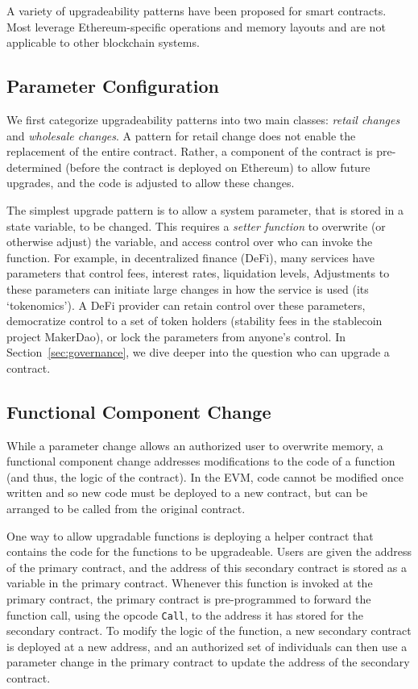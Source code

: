 A variety of upgradeability patterns have been proposed for smart contracts. Most leverage Ethereum-specific operations and memory layouts and are not applicable to other blockchain systems.


\subsection{Parameter Configuration}
\label{sec:parameter}

We first categorize upgradeability patterns into two main classes: \textit{retail changes} and \textit{wholesale changes}. A pattern for retail change does not enable the replacement of the entire contract. Rather, a component of the contract is pre-determined (before the contract is deployed on Ethereum) to allow future upgrades, and the code is adjusted to allow these changes. 

The simplest upgrade pattern is to allow a system parameter, that is stored in a state variable, to be changed. This requires a \textit{setter function} to overwrite (or otherwise adjust) the variable, and access control over who can invoke the function. For example, in decentralized finance (DeFi), many services have parameters that control fees, interest rates, liquidation levels, \etc Adjustments to these parameters can initiate large changes in how the service is used (its `tokenomics'). A DeFi provider can retain control over these parameters, democratize control to a set of token holders (\eg stability fees in the stablecoin project MakerDao), or lock the parameters from anyone's control. In Section~\ref{sec:governance}, we dive deeper into the question who can upgrade a contract. 


\subsection{Functional Component Change}
\label{sec:component}

While a parameter change allows an authorized user to overwrite memory, a functional component change addresses modifications to the code of a function (and thus, the logic of the contract). In the EVM, code cannot be modified once written and so new code must be deployed to a new contract, but can be arranged to be called from the original contract. 

One way to allow upgradable functions is deploying a helper contract that contains the code for the functions to be upgradeable. Users are given the address of the primary contract, and the address of this secondary contract is stored as a variable in the primary contract. Whenever this function is invoked at the primary contract, the primary contract is pre-programmed to forward the function call, using the opcode \texttt{Call}, to the address it has stored for the secondary contract. To modify the logic of the function, a new secondary contract is deployed at a new address, and an authorized set of individuals can then use a parameter change in the primary contract to update the address of the secondary contract.


